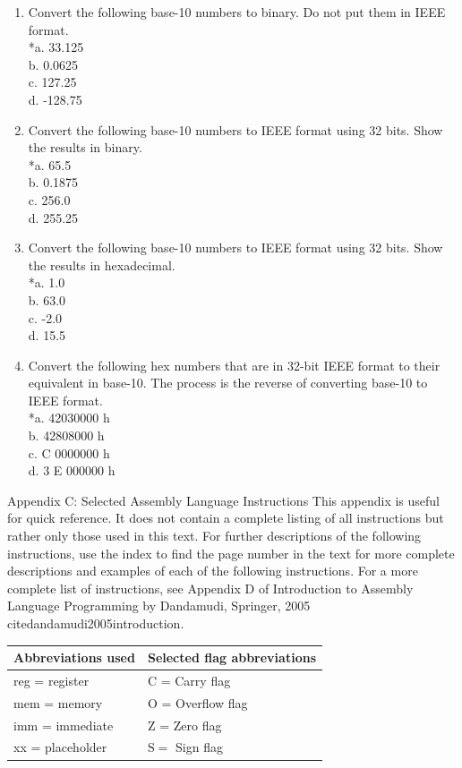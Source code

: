 \documentclass[10pt]{book}
\begin{document}
\begin{enumerate}
*A. 10001000 - 00000001\\
B. 01111011 - 01110010\\
*C. 01011111 - 10111100\\
D. 10000001 - 01011101\\
E. 01111111 - 00010111
  \item Convert the following base-10 numbers to binary. Do not put them in IEEE format.\\
*a. 33.125\\
b. 0.0625\\
c. 127.25\\
d. -128.75
  \item Convert the following base-10 numbers to IEEE format using 32 bits. Show the results in binary.\\
*a. 65.5\\
b. 0.1875\\
c. 256.0\\
d. 255.25
  \item Convert the following base-10 numbers to IEEE format using 32 bits. Show the results in hexadecimal.\\
*a. 1.0\\
b. 63.0\\
c. -2.0\\
d. 15.5
  \item Convert the following hex numbers that are in 32-bit IEEE format to their equivalent in base-10. The process is the reverse of converting base-10 to IEEE format.\\
*a. 42030000 h\\
b. 42808000 h\\
c. C 0000000 h\\
d. 3 E 000000 h
\end{enumerate}

Appendix C: Selected Assembly Language Instructions
This appendix is useful for quick reference. It does not contain a complete listing of all instructions but rather only those used in this text. For further descriptions of the following instructions, use the index to find the page number in the text for more complete descriptions and examples of each of the following instructions. For a more complete list of instructions, see Appendix D of Introduction to Assembly Language Programming by Dandamudi, Springer, 2005 \\cite{dandamudi2005introduction}.

\begin{center}
\begin{tabular}{|l|l|}
\hline
Abbreviations used & Selected flag abbreviations \\
\hline
reg = register & C = Carry flag \\
\hline
mem = memory & O = Overflow flag \\
\hline
imm = immediate & Z = Zero flag \\
\hline
xx = placeholder & $\mathrm{S}=$ Sign flag \\
\hline
\end{tabular}
\end{center}
\end{document}
